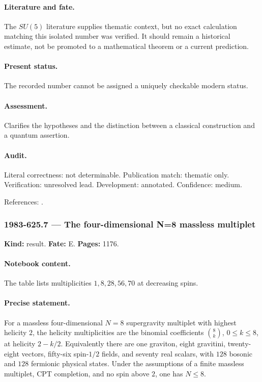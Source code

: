 \paragraph{Literature and fate.} The \(SU(5)\) literature supplies thematic context, but no exact calculation matching this isolated number was verified. It should remain a historical estimate, not be promoted to a mathematical theorem or a current prediction.

\paragraph{Present status.} The recorded number cannot be assigned a uniquely checkable modern status.

\paragraph{Assessment.} Clarifies the hypotheses and the distinction between a classical construction and a quantum assertion.

\paragraph{Audit.} Literal correctness: not determinable. Publication match: thematic only. Verification: unresolved lead. Development: annotated. Confidence: medium.

\noindent References: \citep{georgiglashow1974unity}.\par

\subsubsection{1983-625.7 --- The four-dimensional N=8 massless multiplet}

\label{item:1983-625.7}

\noindent\textbf{Kind:} result. \textbf{Fate:} E. \textbf{Pages:} 1176.\par

\paragraph{Notebook content.} The table lists multiplicities \(1,8,28,56,70\) at decreasing spins.

\paragraph{Precise statement.} For a massless four-dimensional \(N=8\) supergravity multiplet with highest helicity \(2\), the helicity multiplicities are the binomial coefficients \(\binom8k\), \(0\le k\le8\), at helicity \(2-k/2\). Equivalently there are one graviton, eight gravitini, twenty-eight vectors, fifty-six spin-\(1/2\) fields, and seventy real scalars, with \(128\) bosonic and \(128\) fermionic physical states. Under the assumptions of a finite massless multiplet, CPT completion, and no spin above \(2\), one has \(N\le8\).

